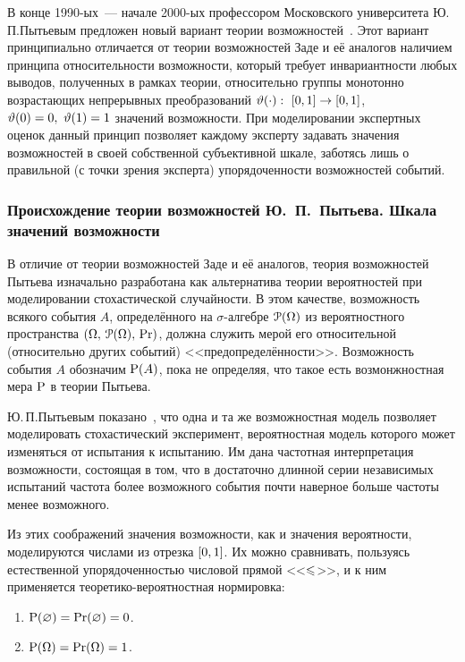 В конце 1990-ых~--- начале 2000-ых профессором Московского университета Ю.\,П.\;Пытьевым предложен новый вариант теории возможностей~\cite{possbook, cit:smf, probbook, pytyev_experts}. Этот вариант принципиально отличается от теории возможностей Заде и её аналогов наличием принципа относительности возможности, который требует инвариантности любых выводов, полученных в рамках теории, относительно группы монотонно возрастающих непрерывных преобразований $\vtheta(\cdot):\ [0,1]\to[0,1]$, $\vtheta(0) = 0,\ \vtheta(1) = 1$ значений возможности. При моделировании экспертных оценок данный принцип позволяет каждому эксперту задавать значения возможностей в своей собственной субъективной шкале, заботясь лишь о правильной (с точки зрения эксперта) упорядоченности возможностей событий.

\subsubsection{Происхождение теории возможностей Ю.~П.~Пытьева. Шкала значений возможности}

В отличие от теории возможностей Заде и её аналогов, теория возможностей Пытьева изначально разработана как альтернатива теории вероятностей при моделировании стохастической случайности.  В этом качестве, возможность всякого события $A$, определённого на $\sigma$-алгебре $\Po(\Omega)$ из вероятностного пространства $\OAPr$, должна служить мерой его относительной (относительно других событий) <<предопределённости>>. Возможность события $A$ обозначим $\P(A)$, пока не определяя, что такое есть возмонжностная мера $\P$ в теории Пытьева. 
\begin{notice}
Ю.\,П.\;Пытьевым показано~\cite{possbook2}, что одна и та же возможностная модель позволяет моделировать стохастический эксперимент, вероятностная модель которого может изменяться от испытания к испытанию.  Им дана частотная интерпретация возможности, состоящая в том, что в достаточно длинной серии независимых испытаний частота более возможного события почти наверное больше частоты менее возможного. 
\end{notice}

Из этих соображений значения возможности,  как и значения вероятности, моделируются числами из отрезка $\zo$. Их можно сравнивать, пользуясь естественной упорядоченностью числовой прямой <<$\leqs$>>, и к ним применяется теоретико-вероятностная нормировка:
\begin{enumerate}
\item\label{item_poss_rel_1}
    $\P(\varnothing) = \Pr(\varnothing) = 0$.
\item\label{item_poss_rel_2}
    $\P(\Omega) = \Pr(\Omega) = 1$.
\end{enumerate}

